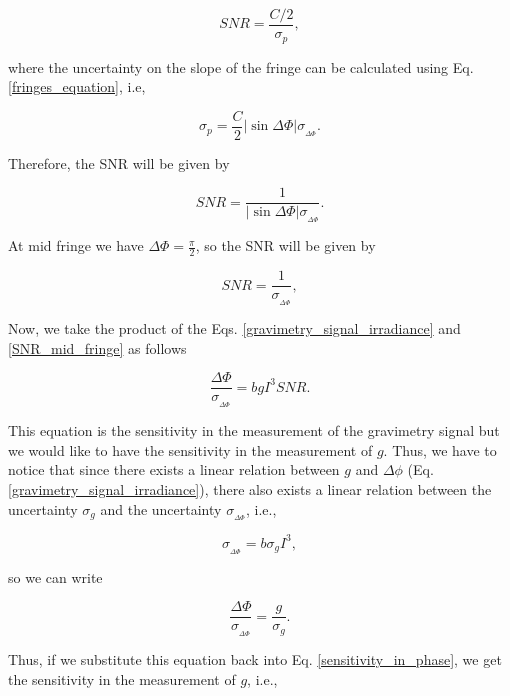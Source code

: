 \documentclass{article}
\begin{document}
\begin{equation}
    SNR = \frac{C/2}{\sigma_{p}}, 
\end{equation}

where the uncertainty on the slope of the fringe can be calculated using Eq. \ref{fringes_equation}, i.e,

\begin{equation}
    \sigma_{p} = \frac{C}{2} |\sin{\Delta \Phi}| \sigma_{_{\Delta \Phi}}.
\end{equation}

Therefore, the SNR will be given by

\begin{equation}
    SNR = \frac{1}{|\sin{\Delta \Phi}|  \sigma_{_{\Delta \Phi}}}.
\end{equation}

At mid fringe we have $\Delta \Phi = \frac{\pi}{2}$, so the SNR will be given by

\begin{equation}\label{SNR_mid_fringe}
    SNR = \frac{1}{\sigma_{_{\Delta \Phi}}},
\end{equation}

Now, we take the product of the Eqs. \ref{gravimetry_signal_irradiance} and \ref{SNR_mid_fringe} as follows

\begin{equation}\label{sensitivity_in_phase}
    \frac{\Delta \Phi}{\sigma_{_{\Delta \Phi}}} = b g I^3 SNR.
\end{equation}

This equation is the sensitivity in the measurement of the gravimetry signal but we would like to have the sensitivity in the measurement of $g$. Thus,
we have to notice that since there exists a linear relation between $g$ and $\Delta \phi$ (Eq. \ref{gravimetry_signal_irradiance}), there also exists a linear relation between the uncertainty $\sigma_{g}$ and the uncertainty $\sigma_{_{\Delta \Phi}}$, i.e.,

\begin{equation}
    \sigma_{_{\Delta \Phi}} = b \sigma_{g} I^3,
\end{equation}

so we can write 

\begin{equation}
    \frac{\Delta \Phi}{\sigma_{_{\Delta \Phi}}} = \frac{g}{\sigma_{g}}.
\end{equation}

Thus, if we substitute this equation back into Eq. \ref{sensitivity_in_phase}, we get the sensitivity in the measurement of $g$, i.e.,
\end{document}
